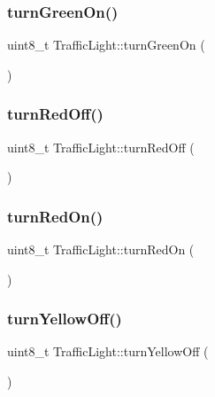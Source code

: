 \hypertarget{class_traffic_light_a9477c1e61facd79e308b297877e3beee}{}\label{class_traffic_light_a9477c1e61facd79e308b297877e3beee} 
\subsubsection{\texorpdfstring{turn\+Green\+On()}{turnGreenOn()}}
{\footnotesize\ttfamily uint8\+\_\+t Traffic\+Light\+::turn\+Green\+On (\begin{DoxyParamCaption}{ }\end{DoxyParamCaption})}

\hypertarget{class_traffic_light_a2ca2808ea156abc199a14939c2ab0c92}{}\label{class_traffic_light_a2ca2808ea156abc199a14939c2ab0c92} 
\subsubsection{\texorpdfstring{turn\+Red\+Off()}{turnRedOff()}}
{\footnotesize\ttfamily uint8\+\_\+t Traffic\+Light\+::turn\+Red\+Off (\begin{DoxyParamCaption}{ }\end{DoxyParamCaption})}

\hypertarget{class_traffic_light_acd3d36d6884744b2230bd234bff27357}{}\label{class_traffic_light_acd3d36d6884744b2230bd234bff27357} 
\subsubsection{\texorpdfstring{turn\+Red\+On()}{turnRedOn()}}
{\footnotesize\ttfamily uint8\+\_\+t Traffic\+Light\+::turn\+Red\+On (\begin{DoxyParamCaption}{ }\end{DoxyParamCaption})}

\hypertarget{class_traffic_light_a17723c3478b4eb754aa8b163234aa8be}{}\label{class_traffic_light_a17723c3478b4eb754aa8b163234aa8be} 
\subsubsection{\texorpdfstring{turn\+Yellow\+Off()}{turnYellowOff()}}
{\footnotesize\ttfamily uint8\+\_\+t Traffic\+Light\+::turn\+Yellow\+Off (\begin{DoxyParamCaption}{ }\end{DoxyParamCaption})}

